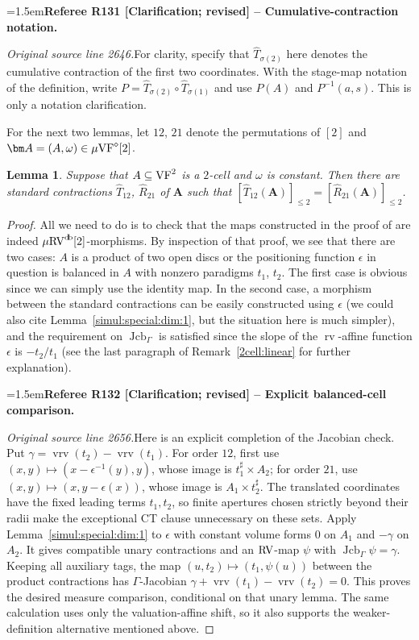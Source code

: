 \documentclass[12pt]{amsart}
\newcommand{\RefereeRemark}[4]{%
  \par\medskip\begingroup\normalfont\small\color{RefereePurple}%
  \emergencystretch=1.5em\noindent\textbf{Referee R#1 [#2] -- #3.}\par\nobreak\noindent #4\par
  \endgroup\medskip
}
\theoremstyle{plain}
\newtheorem{lem}[thm]{Lemma}
\theoremstyle{definition}
\theoremstyle{remark}
\numberwithin{equation}{section}
\theoremstyle{plain}
\newcommand{\VF}{\textup{VF}}
\newcommand{\RV}{\textup{RV}}
\DeclareMathOperator{\jcb}{Jcb}
\newcommand{\0}{\emptyset}
\newcommand{\sub}{\subseteq}
\newcommand{\mVF}{{\mu}{\VF}}
\newcommand{\mRV}{{\mu}{\RV}}
\DeclareMathOperator{\rv}{rv}
\DeclareMathOperator{\vrv}{vrv}
\DeclareMathOperator{\db}{d \! b}
\begin{document}
\RefereeRemark{131}{Clarification; revised}{Cumulative-contraction notation}{%
\textit{Original source line 2646.}\quad For clarity, specify that $\hat T_{\sigma(2)}$ here denotes the cumulative contraction of the first two coordinates. With the stage-map notation of the definition, write $P=\hat T_{\sigma(2)}\circ\hat T_{\sigma(1)}$ and use $P(A)$ and $P^{-1}(a,s)$. This is only a notation clarification.
}


For the next two lemmas, let $12$, $21$ denote the permutations of $[2]$ and $\bm A = (A, \omega) \in \mVF^\diamond[2]$.


\begin{lem}\label{2:unit:contracted}
Suppose that $A \sub \VF^2$ is a $2$-cell and $\omega$ is constant. Then there are standard contractions $\hat T_{12}$, $\hat R_{21}$ of $\bm A$ such that $[\hat T_{12}(\bm A)]_{\leq 2} = [\hat R_{21}(\bm A)]_{\leq 2}$.
\end{lem}
\begin{proof}
All we need to do is to check that the maps constructed in the proof of  \cite[Lemma~5.7]{Yin:int:acvf} are indeed $\mRV^{\db}[2]$-morphisms. By inspection of that proof, we see that there are two cases: $A$ is a product of two open discs or the positioning function $\epsilon$ in question is balanced in $A$ with nonzero paradigms $t_1$, $t_2$. The first case is obvious since we can simply use the identity map. In the second case,  a morphism between the standard contractions can be easily constructed using  $\epsilon$  (we could also cite Lemma~\ref{simul:special:dim:1}, but the situation here is much simpler), and  the requirement on $\jcb_{\Gamma}$ is satisfied since the slope of the $\rv$-affine function $\epsilon$ is $-t_2/t_1$ (see the last paragraph of Remark~\ref{2cell:linear} for further explanation).

\RefereeRemark{132}{Clarification; revised}{Explicit balanced-cell comparison}{%
\textit{Original source line 2656.}\quad Here is an explicit completion of the Jacobian check. Put $\gamma=\vrv(t_2)-\vrv(t_1)$. For order $12$, first use $(x,y)\mapsto(x-\epsilon^{-1}(y),y)$, whose image is $t_1^\sharp\times A_2$; for order $21$, use $(x,y)\mapsto(x,y-\epsilon(x))$, whose image is $A_1\times t_2^\sharp$. The translated coordinates have the fixed leading terms $t_1,t_2$, so finite apertures chosen strictly beyond their radii make the exceptional CT clause unnecessary on these sets. Apply Lemma~\ref{simul:special:dim:1} to $\epsilon$ with constant volume forms $0$ on $A_1$ and $-\gamma$ on $A_2$. It gives compatible unary contractions and an $\RV$-map $\psi$ with $\jcb_\Gamma\psi=\gamma$. Keeping all auxiliary tags, the map $(u,t_2)\mapsto(t_1,\psi(u))$ between the product contractions has $\Gamma$-Jacobian $\gamma+\vrv(t_1)-\vrv(t_2)=0$. This proves the desired measure comparison, conditional on that unary lemma. The same calculation uses only the valuation-affine shift, so it also supports the weaker-definition alternative mentioned above.
}
\end{proof}
\end{document}
